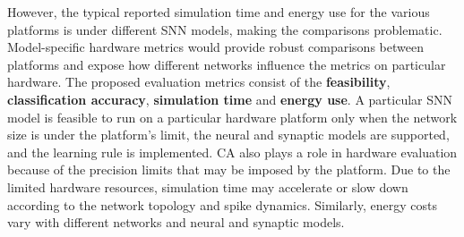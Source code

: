 However, the typical reported simulation time and energy use for the various platforms is under different SNN models, making the comparisons problematic.
Model-specific hardware metrics would provide robust comparisons between platforms and expose how different networks influence the metrics on particular hardware.
The proposed evaluation metrics consist of the \textbf{feasibility}, \textbf{classification accuracy}, \textbf{simulation time} and \textbf{energy use}.
A particular SNN model is feasible to run on a particular hardware platform only when the network size is under the platform's limit, the neural and synaptic models are supported, and the learning rule is implemented.
CA also plays a role in hardware evaluation because of the precision limits that may be imposed by the platform.
Due to the limited hardware resources, simulation time may accelerate or slow down according to the network topology and spike dynamics.
Similarly, energy costs vary with different networks and neural and synaptic models.

